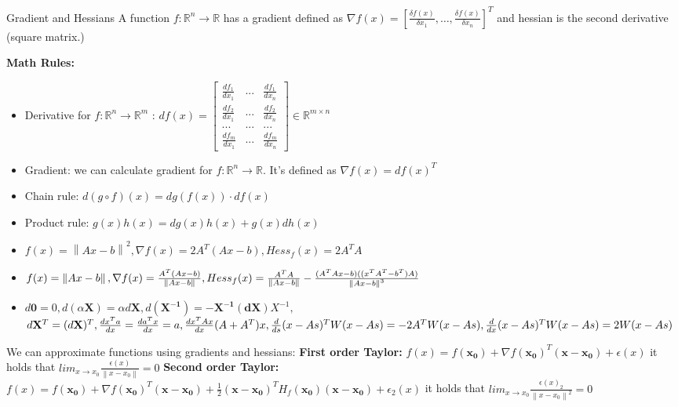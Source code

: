 \documentclass[a4paper]{article}
\begin{document}
\begin{mainbox}{Gradient and Hessians}
    A function $f: \mathbb{R}^n \to \mathbb{R}$ has a gradient defined as $\nabla f(x) = \left[\frac{\delta f(x)}{\delta x_1}, \dots, \frac{\delta f(x)}{\delta x_n}\right]^T$ and hessian is the second derivative (square matrix.)   
\end{mainbox}
\textbf{Math Rules:} 
\begin{itemize}
    \item Derivative for $f:\mathbb{R}^n \to \mathbb{R}^m$ :
    $ df(x) = \left[\begin{smallmatrix} 
        \frac{df_1}{dx_1} & ... & \frac{df_1}{dx_n}\\
        \frac{df_2}{dx_1} & ... & \frac{df_2}{dx_n}\\
        ... & ... & ... \\
        \frac{df_m}{dx_1} & ... & \frac{df_m}{dx_n}
    \end{smallmatrix}\right] \in \mathbb{R}^{m\times n}$ 
    \item Gradient: we can calculate gradient for $f: \mathbb{R}^n \to \mathbb{R}$. It's defined as $\nabla f(x) = df(x)^T$ 
    \item Chain rule: $d(g\circ f)(x) = dg(f(x)) \cdot df(x)$ 
    \item Product rule: $g(x)h(x) = dg(x)h(x) + g(x)dh(x)$ 
    \item $f(x)= \left\lVert Ax-b\right\rVert ^2, \nabla f(x) = 2A^T(Ax-b), Hess_f(x) = 2A^TA$
    \item $f(x) = \left\lVert Ax-b\right\rVert, \nabla f(x) = \frac{A^T(Ax-b)}{\left\lVert Ax-b\right\rVert}, \\ Hess_f(x)= \frac{A^TA}{\left\lVert Ax-b\right\rVert }  - \frac{(A^TAx-b)((x^TA^T-b^T)A)}{\left\lVert Ax-b\right\rVert^3 }$  
    \item $d\mathbf{0} = 0, d(\alpha \mathbf{X}) = \alpha d\mathbf{X}, d(\mathbf{X^{-1}}) = -\mathbf{X^{-1}}(\mathbf{dX})X^{-1},$\\
     $d\mathbf{X}^T = (d\mathbf{X})^T, \frac{dx^Ta}{dx} = \frac{da^Tx}{dx} =a, \frac{dx^TAx}{dx} (A+A^T)x, \\
     \frac{d}{ds}(x-As)^TW(x-As) = -2A^TW(x-As), \\ \frac{d}{dx}(x-As)^TW(x-As) = 2W(x-As)$    
\end{itemize}



We can approximate functions using gradients and hessians:
\textbf{First order Taylor:} 
$f(x) = f(\mathbf{x_0}) + \nabla f(\mathbf{x_0})^T (\mathbf{x-x_0}) + \epsilon(x)$ it holds that $lim_{x \to x_0}\frac{\epsilon(x)}{\left\lVert x-x_0\right\rVert } = 0$ 
\textbf{Second order Taylor:} 
$f(x) = f(\mathbf{x_0}) + \nabla f(\mathbf{x_0})^T (\mathbf{x-x_0}) + \frac{1}{2}(\mathbf{x-x_0})^T H_f(\mathbf{x_0})(\mathbf{x-x_0}) + \epsilon_2(x)$ it holds that $lim_{x \to x_0}\frac{\epsilon(x)_2}{\left\lVert x-x_0\right\rVert^2 } = 0$ 
\end{document}
